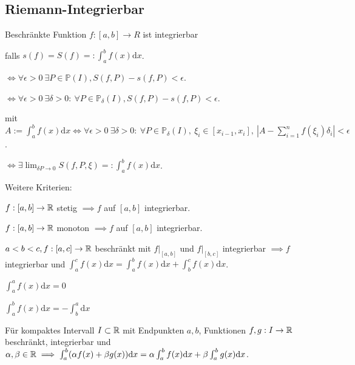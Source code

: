 \subsection{Riemann-Integrierbar}
Beschränkte Funktion $f:[a,b] \to R$ ist integrierbar
\begin{compactitem}
    \item falls $s(f) = S(f) =: \int_{a}^{b} f(x) \mathrm{d}x$.
    \item $\iff \forall \epsilon > 0 \ \exists P \in \mathbb{P}(I), S(f, P) - s(f, P) < \epsilon$.
    \item $\iff \forall \epsilon > 0 \ \exists \delta > 0: \ \forall P \in \mathbb{P}_\delta(I), S(f, P) - s(f, P) < \epsilon$.
    \item mit $A:= \int_{a}^{b} f(x) \mathrm{d}x \iff \forall \epsilon > 0 \ \exists \delta > 0: \ \forall P \in \mathbb{P}_\delta(I), \ \xi_i \in [x_{i-1}, x_i], \ \left| A - \sum_{i=1}^{n} f(\xi_i) \delta_i \right| < \epsilon$.
    \item $\iff \exists \lim_{\delta{P} \to 0} S(f, P, \xi) =: \int_{a}^{b} f(x) \mathrm{d}x$.
\end{compactitem}

Weitere Kriterien:
\begin{compactitem}
    \item $f: [a, b] \to \mathbb{R}$ stetig $\implies f$ auf $[a,b]$ integrierbar.
    \item $f: [a, b] \to \mathbb{R}$ monoton $\implies f$ auf $[a,b]$ integrierbar.
    \item $a < b < c, f: [a, c] \to \mathbb{R}$ beschränkt mit $f|_{[a,b]}$ und $f|_{[b,c]}$ integrierbar $\implies f$ integrierbar und $\int_{a}^{c} f(x) \mathrm{d}x = \int_{a}^{b} f(x) \mathrm{d}x + \int_{b}^{c} f(x) \mathrm{d}x$.
    \item
        \begin{inparaitem}
            \item $\int_{a}^{a} f(x)\mathrm{d}x = 0$
            \item $\int_{a}^{b} f(x)\mathrm{d}x = -\int_{b}^{a} \mathrm{d}x$
        \end{inparaitem}
    \item Für kompaktes Intervall $I \subset \mathbb{R}$ mit Endpunkten $a,b$, Funktionen $f, g : I \to \mathbb{R}$ beschränkt, integrierbar und $\alpha, \beta \in \mathbb{R} \implies \int_{a}^{b} (\alpha f(x) + \beta g(x)) \mathrm{d}x = \alpha \int_{a}^{b} f(x) \mathrm{d}x + \beta \int_{a}^{b} g(x)\mathrm{d}x$.
\end{compactitem}

